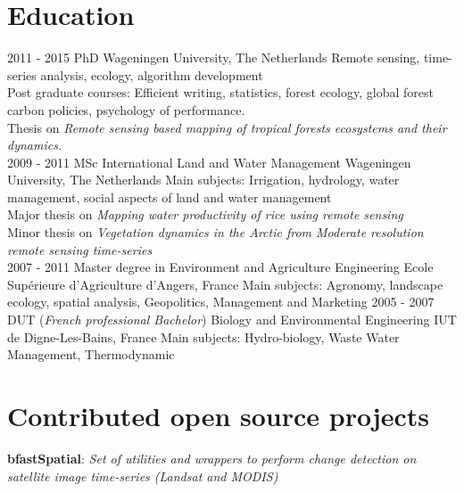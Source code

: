 \documentclass[]{friggeri-cv}
\begin{document}
\section{Education}
\begin{entrylist}
  \entry
    {2011 - 2015}
    {PhD}
    {Wageningen University, The Netherlands}
    {Remote sensing, time-series analysis, ecology, algorithm development\\
    Post graduate courses: Efficient writing, statistics, forest ecology, global forest carbon policies, psychology of performance.\\
    Thesis on \emph{Remote sensing based mapping of tropical forests ecosystems and their dynamics.}\\}
  \entry
    {2009 - 2011}
    {MSc International Land and Water Management}
    {Wageningen University, The Netherlands}
    {Main subjects: Irrigation, hydrology, water management, social aspects of land and water management \\
    Major thesis on \emph{Mapping water productivity of rice using remote sensing}\\
    Minor thesis on \emph{Vegetation dynamics in the Arctic from Moderate resolution remote sensing time-series}\\}
  \entry
    {2007 - 2011}
    {Master degree in Environment and Agriculture Engineering}
    {Ecole Supérieure d'Agriculture d'Angers, France}
    {Main subjects: Agronomy, landscape ecology, spatial analysis, Geopolitics, Management and Marketing}
  \entry
    {2005 - 2007}
    {DUT (\textit{French professional Bachelor}) Biology and Environmental Engineering}
    {IUT de Digne-Les-Bains, France}
    {Main subjects: Hydro-biology, Waste Water Management, Thermodynamic}
\end{entrylist}

\section{Contributed open source projects}
    \textbf{bfastSpatial}: \textit{Set of utilities and wrappers to perform change detection on satellite image time-series (Landsat and MODIS)}
\end{document}
